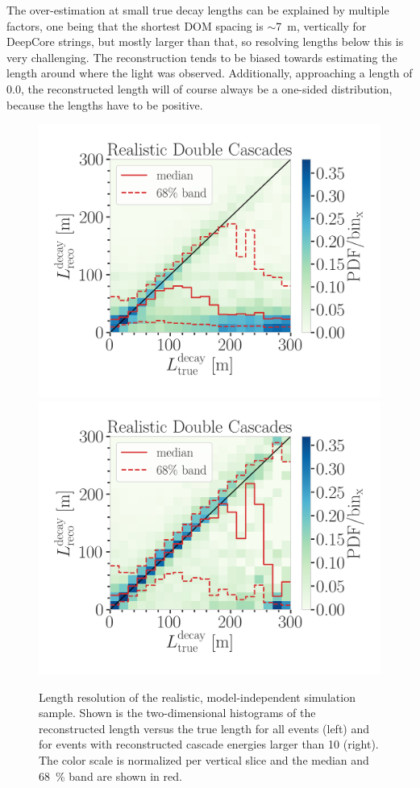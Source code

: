 The over-estimation at small true decay lengths can be explained by multiple factors, one being that the shortest DOM spacing is $\sim$\SI{7}{\meter}, vertically for DeepCore strings, but mostly larger than that, so resolving lengths below this is very challenging. The reconstruction tends to be biased towards estimating the length around where the light was observed. Additionally, approaching a length of 0.0, the reconstructed length will of course always be a one-sided distribution, because the lengths have to be positive.

\begin{figure}[h]
	\centering
    \includegraphics[width=0.49\linewidth]{figures/model_independent_simulation/results/realistic/2d_hists/194603_reco_decay_length_vs_true_decay_length_goodfit_step_contours.png}
    \includegraphics[width=0.49\linewidth]{figures/model_independent_simulation/results/realistic/2d_hists/194603_reco_decay_length_vs_true_decay_length_goodfit_above_10_GeV_step_contours}
    \caption[Realistic double cascade length resolution]{Length resolution of the realistic, model-independent simulation sample. Shown is the two-dimensional histograms of the reconstructed length versus the true length for all events (left) and for events with reconstructed cascade energies larger than \SI{10}{\gev} (right). The color scale is normalized per vertical slice and the median and \SI{68}{\percent} band are shown in red.}
\end{figure}

